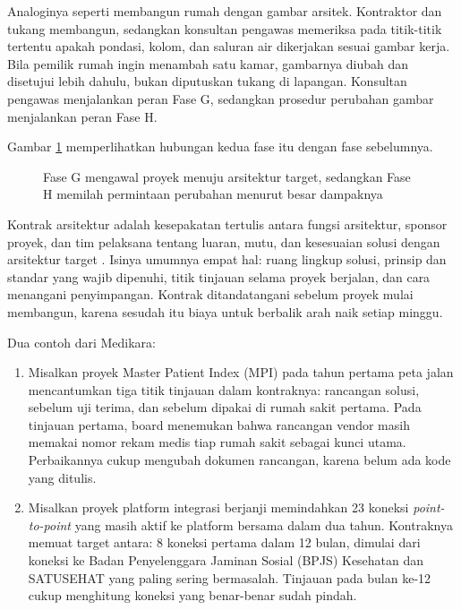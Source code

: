 Analoginya seperti membangun rumah dengan gambar arsitek. Kontraktor dan
tukang membangun, sedangkan konsultan pengawas memeriksa pada titik-titik
tertentu apakah pondasi, kolom, dan saluran air dikerjakan sesuai gambar
kerja. Bila pemilik rumah ingin menambah satu kamar, gambarnya diubah dan
disetujui lebih dahulu, bukan diputuskan tukang di lapangan. Konsultan
pengawas menjalankan peran Fase G, sedangkan prosedur perubahan gambar
menjalankan peran Fase H.

Gambar \ref{fig:ch14-siklus-gh} memperlihatkan hubungan kedua fase itu
dengan fase sebelumnya.

\begin{figure}[!htb]
  \centering
  
  \caption{Fase G mengawal proyek menuju arsitektur target, sedangkan Fase H
           memilah permintaan perubahan menurut besar dampaknya}
  \label{fig:ch14-siklus-gh}
\end{figure}

Kontrak arsitektur adalah kesepakatan tertulis antara fungsi arsitektur,
sponsor proyek, dan tim pelaksana tentang luaran, mutu, dan kesesuaian
solusi dengan arsitektur target \cite{togaf10}. Isinya umumnya empat hal:
ruang lingkup solusi, prinsip dan standar yang wajib dipenuhi, titik
tinjauan selama proyek berjalan, dan cara menangani penyimpangan. Kontrak
ditandatangani sebelum proyek mulai membangun, karena sesudah itu biaya
untuk berbalik arah naik setiap minggu.

Dua contoh dari Medikara:

\begin{enumerate}
  \item Misalkan proyek Master Patient Index (MPI) pada tahun pertama peta
        jalan mencantumkan tiga titik tinjauan dalam kontraknya: rancangan
        solusi, sebelum uji terima, dan sebelum dipakai di rumah sakit
        pertama. Pada tinjauan pertama, board menemukan bahwa rancangan
        vendor masih memakai nomor rekam medis tiap rumah sakit sebagai kunci
        utama. Perbaikannya cukup mengubah dokumen rancangan, karena belum
        ada kode yang ditulis.
  \item Misalkan proyek platform integrasi berjanji memindahkan 23 koneksi
        \textit{point-to-point} yang masih aktif ke platform bersama dalam
        dua tahun. Kontraknya memuat target antara: 8 koneksi pertama dalam
        12 bulan, dimulai dari koneksi ke Badan Penyelenggara Jaminan Sosial
        (BPJS) Kesehatan dan SATUSEHAT yang paling sering bermasalah.
        Tinjauan pada bulan ke-12 cukup menghitung koneksi yang benar-benar
        sudah pindah.
\end{enumerate}

